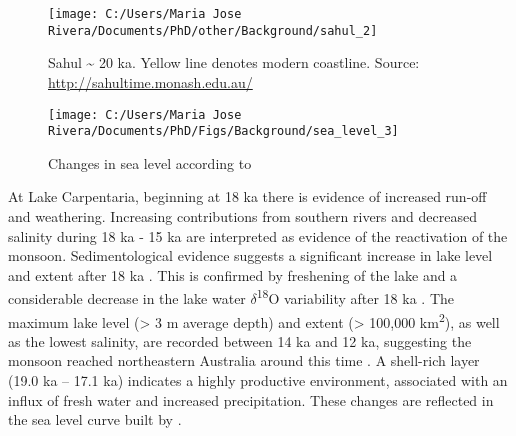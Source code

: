 \documentclass[
  12pt,
]{book}
\begin{document}
\begin{figure}

{\centering \texttt{[image: C:/Users/Maria Jose Rivera/Documents/PhD/other/Background/sahul\_2]} 

}

\caption{Sahul \textasciitilde{} 20 ka. Yellow line denotes modern coastline. Source: \url{http://sahultime.monash.edu.au/}}\label{fig:fig-sea3}
\end{figure}



\begin{figure}

{\centering \texttt{[image: C:/Users/Maria Jose Rivera/Documents/PhD/Figs/Background/sea\_level\_3]} 

}

\caption{Changes in sea level according to \citet{lambeckSeaLevelGlobal2014}}\label{fig:fig-sea2}
\end{figure}



At Lake Carpentaria, beginning at 18 ka there is evidence of increased run-off and weathering. Increasing contributions from southern rivers and decreased salinity during 18 ka - 15 ka are interpreted as evidence of the reactivation of the monsoon. Sedimentological evidence suggests a significant increase in lake level and extent after 18 ka \citep{reevesSedimentaryRecordPalaeoenvironments2008}. This is confirmed by freshening of the lake and a considerable decrease in the lake water \(\delta\)\textsuperscript{18}O variability after 18 ka \citep{reevesSedimentaryRecordPalaeoenvironments2008}. The maximum lake level (\textgreater{} 3 m average depth) and extent (\textgreater{} 100,000 km\textsuperscript{2}), as well as the lowest salinity, are recorded between 14 ka and 12 ka, suggesting the monsoon reached northeastern Australia around this time \citep{reevesSedimentaryRecordPalaeoenvironments2008}. A shell-rich layer (19.0 ka -- 17.1 ka) indicates a highly productive environment, associated with an influx of fresh water and increased precipitation. These changes are reflected in the sea level curve built by \citet{brookePalaeoshorelinesAustralianContinental2017}.
\end{document}
